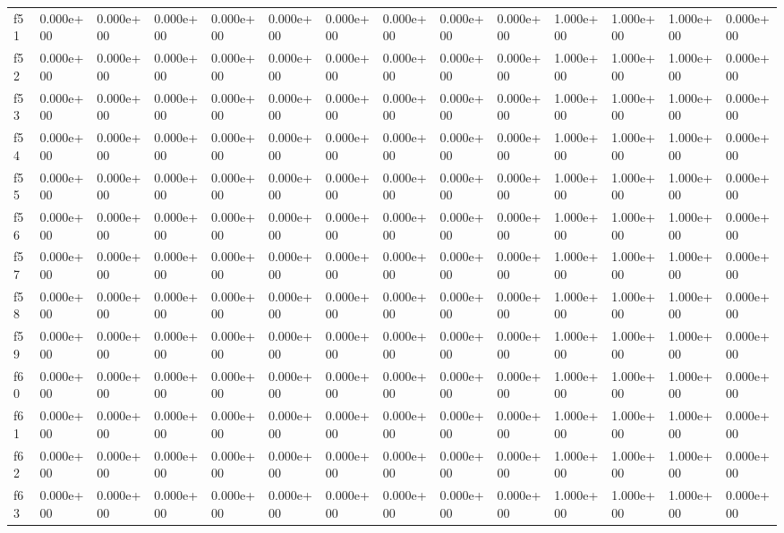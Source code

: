 \begin{table}
\begin{tabular}{llllllllllllll}
f51 & 0.000e+00 & 0.000e+00 & 0.000e+00 & 0.000e+00 & 0.000e+00 & 0.000e+00 & 0.000e+00 & 0.000e+00 & 0.000e+00 & 1.000e+00 & 1.000e+00 & 1.000e+00 & 0.000e+00 \\
f52 & 0.000e+00 & 0.000e+00 & 0.000e+00 & 0.000e+00 & 0.000e+00 & 0.000e+00 & 0.000e+00 & 0.000e+00 & 0.000e+00 & 1.000e+00 & 1.000e+00 & 1.000e+00 & 0.000e+00 \\
f53 & 0.000e+00 & 0.000e+00 & 0.000e+00 & 0.000e+00 & 0.000e+00 & 0.000e+00 & 0.000e+00 & 0.000e+00 & 0.000e+00 & 1.000e+00 & 1.000e+00 & 1.000e+00 & 0.000e+00 \\
f54 & 0.000e+00 & 0.000e+00 & 0.000e+00 & 0.000e+00 & 0.000e+00 & 0.000e+00 & 0.000e+00 & 0.000e+00 & 0.000e+00 & 1.000e+00 & 1.000e+00 & 1.000e+00 & 0.000e+00 \\
f55 & 0.000e+00 & 0.000e+00 & 0.000e+00 & 0.000e+00 & 0.000e+00 & 0.000e+00 & 0.000e+00 & 0.000e+00 & 0.000e+00 & 1.000e+00 & 1.000e+00 & 1.000e+00 & 0.000e+00 \\
f56 & 0.000e+00 & 0.000e+00 & 0.000e+00 & 0.000e+00 & 0.000e+00 & 0.000e+00 & 0.000e+00 & 0.000e+00 & 0.000e+00 & 1.000e+00 & 1.000e+00 & 1.000e+00 & 0.000e+00 \\
f57 & 0.000e+00 & 0.000e+00 & 0.000e+00 & 0.000e+00 & 0.000e+00 & 0.000e+00 & 0.000e+00 & 0.000e+00 & 0.000e+00 & 1.000e+00 & 1.000e+00 & 1.000e+00 & 0.000e+00 \\
f58 & 0.000e+00 & 0.000e+00 & 0.000e+00 & 0.000e+00 & 0.000e+00 & 0.000e+00 & 0.000e+00 & 0.000e+00 & 0.000e+00 & 1.000e+00 & 1.000e+00 & 1.000e+00 & 0.000e+00 \\
f59 & 0.000e+00 & 0.000e+00 & 0.000e+00 & 0.000e+00 & 0.000e+00 & 0.000e+00 & 0.000e+00 & 0.000e+00 & 0.000e+00 & 1.000e+00 & 1.000e+00 & 1.000e+00 & 0.000e+00 \\
f60 & 0.000e+00 & 0.000e+00 & 0.000e+00 & 0.000e+00 & 0.000e+00 & 0.000e+00 & 0.000e+00 & 0.000e+00 & 0.000e+00 & 1.000e+00 & 1.000e+00 & 1.000e+00 & 0.000e+00 \\
f61 & 0.000e+00 & 0.000e+00 & 0.000e+00 & 0.000e+00 & 0.000e+00 & 0.000e+00 & 0.000e+00 & 0.000e+00 & 0.000e+00 & 1.000e+00 & 1.000e+00 & 1.000e+00 & 0.000e+00 \\
f62 & 0.000e+00 & 0.000e+00 & 0.000e+00 & 0.000e+00 & 0.000e+00 & 0.000e+00 & 0.000e+00 & 0.000e+00 & 0.000e+00 & 1.000e+00 & 1.000e+00 & 1.000e+00 & 0.000e+00 \\
f63 & 0.000e+00 & 0.000e+00 & 0.000e+00 & 0.000e+00 & 0.000e+00 & 0.000e+00 & 0.000e+00 & 0.000e+00 & 0.000e+00 & 1.000e+00 & 1.000e+00 & 1.000e+00 & 0.000e+00 \\

\end{tabular}
\end{table}
